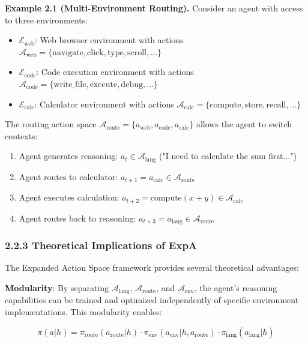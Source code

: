 \textbf{Example 2.1 (Multi-Environment Routing).} Consider an agent with access to three environments:
\begin{itemize}
    \item $\mathcal{E}_{\text{web}}$: Web browser environment with actions $\mathcal{A}_{\text{web}} = \{\text{navigate}, \text{click}, \text{type}, \text{scroll}, \ldots\}$
    \item $\mathcal{E}_{\text{code}}$: Code execution environment with actions $\mathcal{A}_{\text{code}} = \{\text{write\_file}, \text{execute}, \text{debug}, \ldots\}$
    \item $\mathcal{E}_{\text{calc}}$: Calculator environment with actions $\mathcal{A}_{\text{calc}} = \{\text{compute}, \text{store}, \text{recall}, \ldots\}$

\end{itemize}
The routing action space $\mathcal{A}_{\text{route}} = \{a_{\text{web}}, a_{\text{code}}, a_{\text{calc}}\}$ allows the agent to switch contexts:

\begin{enumerate}
    \item Agent generates reasoning: $a_t \in \mathcal{A}_{\text{lang}}$ ("I need to calculate the sum first...")
    \item Agent routes to calculator: $a_{t+1} = a_{\text{calc}} \in \mathcal{A}_{\text{route}}$
    \item Agent executes calculation: $a_{t+2} = \text{compute}(x + y) \in \mathcal{A}_{\text{calc}}$
    \item Agent routes back to reasoning: $a_{t+3} = a_{\text{lang}} \in \mathcal{A}_{\text{route}}$

\end{enumerate}
\subsubsection{2.2.3 Theoretical Implications of ExpA}

The Expanded Action Space framework provides several theoretical advantages:

\textbf{Modularity}: By separating $\mathcal{A}_{\text{lang}}$, $\mathcal{A}_{\text{route}}$, and $\mathcal{A}_{\text{env}}$, the agent's reasoning capabilities can be trained and optimized independently of specific environment implementations. This modularity enables:

$$\pi(a | h) = \pi_{\text{route}}(a_{\text{route}} | h) \cdot \pi_{\text{env}}(a_{\text{env}} | h, a_{\text{route}}) \cdot \pi_{\text{lang}}(a_{\text{lang}} | h)$$

